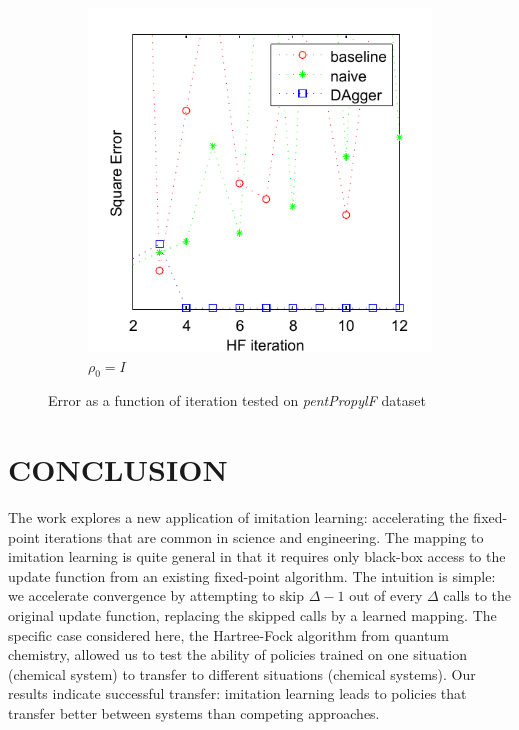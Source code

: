 \documentclass[twoside,11pt]{article}
\begin{document}
\begin{figure}[h!]
\begin{subfigure}{.5\textwidth}
  \includegraphics[scale=0.7]{propylsub_peye_test_12iter_naive.pdf}
  \caption{$\rho_0 = I$}
  \label{fig:propSubI}
\end{subfigure}
\caption{Error as a function of iteration tested on \textit{pentPropylF} dataset}
\label{fig:testpropSub}
\end{figure}


\section{CONCLUSION}

The work explores a new application of imitation learning: accelerating the fixed-point iterations that are common in science and engineering. The mapping to imitation learning is quite general in that it requires only black-box access to the update function from an existing fixed-point algorithm.  The intuition is simple: we accelerate convergence by attempting to skip $\Delta-1$ out of every $\Delta$ calls to the original update function, replacing the skipped calls by a learned mapping.
The specific case considered here, the Hartree-Fock algorithm from quantum chemistry, allowed us to test the ability of policies trained on one situation (chemical system) to transfer to different situations (chemical systems). Our results  indicate successful transfer: imitation learning leads to policies that transfer better between systems than competing approaches.
\end{document}
